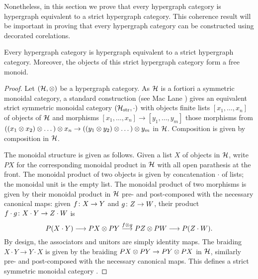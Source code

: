 Nonetheless, in this section we prove that every hypergraph category is
hypergraph equivalent to a strict hypergraph category. This coherence result
will be important in proving that every hypergraph category can be constructed
using decorated corelations.

\begin{theorem}
  Every hypergraph category is hypergraph equivalent to a strict hypergraph
  category. Moreover, the objects of this strict hypergraph category form a free
  monoid.
\end{theorem}
\begin{proof}
  Let $(\mathcal H,\otimes)$ be a hypergraph category. As $\mathcal H$ is a fortiori a
  symmetric monoidal category, a standard construction (see Mac Lane
  \cite[Theorem]{Mac98}) gives an equivalent strict symmetric monoidal category
  $(\mathcal H_{\mathrm{str}}, \cdot)$ with objects finite lists $[x_1,\dots,x_n]$ of
  objects of $\mathcal H$ and morphisms $[x_1,\dots,x_n] \to [y_1,\dots,y_m]$ those
  morphisms from $((x_1 \otimes x_2) \otimes \dots) \otimes x_n \to ((y_1 \otimes y_2) \otimes
  \dots) \otimes y_m$ in $\mathcal H$.  Composition is given by composition in $\mathcal H$.
  
  The monoidal structure is given as follows. Given a list $X$ of objects in
  $\mathcal H$, write $PX$ for the corresponding monoidal product in $\mathcal H$ with all
  open parathesis at the front.  The monoidal product of two objects is given by
  concatenation $\cdot$ of lists; the monoidal unit is the empty list. The
  monoidal product of two morphisms is given by their monoidal product in $\mathcal
  H$ pre- and post-composed with the necessary canonical maps: given $f{\colon} X
  \to Y$ and $g{\colon} Z \to W$, their product $f\cdot g{\colon} X\cdot Y \to Z \cdot
  W$ is \[ P(X \cdot Y) \longrightarrow PX \otimes PY \stackrel{f \otimes
  g}{\longrightarrow} PZ \otimes PW \longrightarrow P(Z \cdot W).  \] By design, the
  associators and unitors are simply identity maps. The braiding $X \cdot Y \to
  Y \cdot X$ is given by the braiding $PX \otimes PY \to PY \otimes PX$ in $\mathcal H$,
  similarly pre- and post-composed with the necessary canonical maps. This
  defines a strict symmetric monoidal category \cite{Mac98}.


\end{proof}
